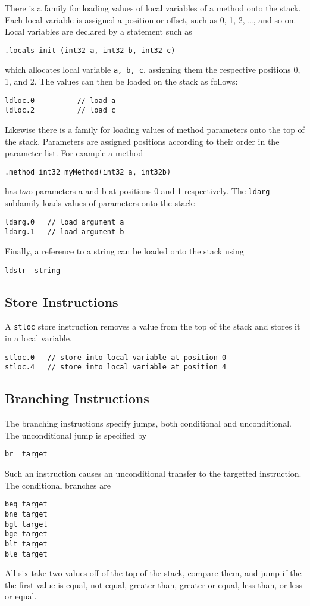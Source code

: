 \documentclass[10pt,a4paper]{amsart}
\begin{document}
There is a family for loading values of local variables of a method onto the stack. Each local
variable is assigned a position or offset, such as 0, 1, 2, \ldots, and so on. Local variables 
are declared by a statement such as
\begin{verbatim}
.locals init (int32 a, int32 b, int32 c)
\end{verbatim}
which allocates local variable {\tt a, b, c}, assigning them the respective positions 0, 1, and 2.
The values can then be loaded on the stack as follows:
\begin{verbatim}
ldloc.0          // load a
ldloc.2          // load c
\end{verbatim}

Likewise there is a family for loading values of method parameters onto the top of the stack.
Parameters are assigned positions according to their order in the parameter list. For example
a method 
\begin{verbatim}
.method int32 myMethod(int32 a, int32b)
\end{verbatim}
has two parameters a and b at positions 0 and 1 respectively.
The {\tt ldarg} subfamily loads values of parameters onto the stack:
\begin{verbatim}
ldarg.0   // load argument a
ldarg.1   // load argument b
\end{verbatim}

Finally, a reference to a string can be loaded onto the stack using
\begin{verbatim}
ldstr  string
\end{verbatim}

\subsection{Store Instructions}

A  {\tt stloc} store instruction removes a value from the top of the stack and stores it in a local variable.
\begin{verbatim}
stloc.0   // store into local variable at position 0
stloc.4   // store into local variable at position 4
\end{verbatim}

\subsection{Branching Instructions}
The branching instructions specify jumps, both conditional and unconditional.
The unconditional jump is specified by
\begin{verbatim}
br  target
\end{verbatim}
Such an instruction causes an unconditional transfer to the targetted instruction.
The conditional branches are 
\begin{verbatim}
beq target
bne target
bgt target
bge target
blt target
ble target
\end{verbatim}
All six take two values off of the top of the stack, compare them, and jump if the the first value
is equal, not equal, greater than, greater or equal, less than, or less or equal.
\end{document}
